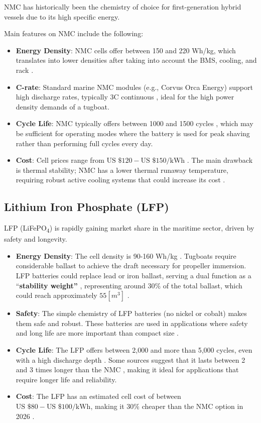 NMC has historically been the chemistry of choice for first-generation hybrid vessels due to its high specific energy. 

Main features on NMC include the following:

\begin{itemize}
	\item \textbf{Energy Density}: NMC cells offer between 150 and 220 Wh/kg, which translates into lower densities after taking into account the BMS, cooling, and rack \cite{UFine}.
	\item \textbf{C-rate}: Standard marine NMC modules (e.g., Corvus Orca Energy) support high discharge rates, typically 3C continuous \cite{Corvus}, ideal for the high power density demands of a tugboat.
	\item \textbf{Cycle Life}: NMC typically offers between 1000 and 1500 cycles \cite{evlithium}, which may be sufficient for operating modes where the battery is used for peak shaving rather than performing full cycles every day.
	\item \textbf{Cost}: 
Cell prices range from $\text{US }\$120-\text{US }\$150/\text{kWh}$ \cite{UFine}. The main drawback is thermal stability; NMC has a lower thermal runaway temperature, requiring robust active cooling systems that could increase its cost \cite{Sunreef}. 	
\end{itemize}

\subsection{Lithium Iron Phosphate (LFP)}
LFP (LiFePO\textsubscript{4}) is rapidly gaining market share in the maritime sector, driven by safety and longevity.

\begin{itemize}
\item \textbf{Energy Density}: The cell density is 90-160 Wh/kg \cite{evlithium}. Tugboats require considerable ballast to achieve the draft necessary for propeller immersion. LFP batteries could replace lead or iron ballast, serving a dual function as a “\textbf{stability weight”} \cite{UFine}, representing around $30\%$ of the total ballast, which could reach approximately $55 [{m}^{3}]$ \cite{cotecmar}.
	\item \textbf{Safety}: The simple chemistry of LFP batteries (no nickel or cobalt) makes them safe and robust. These batteries are used in applications where safety and long life are more important than compact size \cite{Bonnen}.
	\item  \textbf{Cycle Life}: The LFP offers between 2,000 and more than 5,000 cycles, even with a high discharge depth \cite{evlithium}. Some sources suggest that it lasts between 2 and 3 times longer than the NMC \cite{UFine}, making it ideal for applications that require longer life and reliability.
	
	\item \textbf{Cost}: The LFP has an estimated cell cost of between $\text{US }\$80-\text{US }\$100/\text{kWh}$, making it $30\%$ cheaper than the NMC option in 2026 \cite{UFine}.
\end{itemize}

